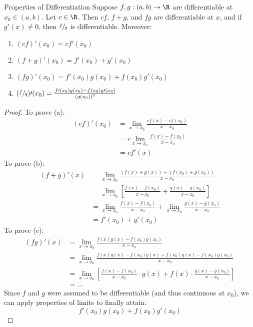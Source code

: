 \begin{thmbox}{Properties of Differentiation}{}
    Suppose $f,g : (a,b) \to \R$ are differentiable at $x_0 \in (a,b)$. Let $c \in \R$. Then $cf$, $f+g$, and $fg$ are differentiable at $x$, and if $g\prime(x) \neq 0$, then $\sfrac{f}{g}$ is differentiable. Moreover:
    \begin{enumerate}[label=(\alph*)]
        \item $(cf)\prime(x_0) = cf\prime(x_0)$
        \item $(f+g)\prime(x_0) = f\prime(x_0) + g\prime(x_0)$
        \item $(fg)\prime(x_0) = f\prime (x_0) g(x_0) + f(x_0) g\prime (x_0)$
        \item $( \sfrac{f}{g})\prime(x_0) = \frac{f\prime(x_0) g(x_0) - f(x_0) g\prime(x_0)}{\left( g(x_0) \right)^2}$
    \end{enumerate}
    \tcblower
    \begin{proof}[Proof]
        To prove (a):
        \begin{align*}
            (cf)\prime(x_0)
            &= \lim_{x \to x_0} \frac{cf(x) - cf(x_0)}{x - x_0} \\
            &= c \lim_{x \to x_0} \frac{f(x) - f(x_0)}{x - x_0} \\
            &= c f\prime(x)
        \end{align*}
        To prove (b):
        \begin{align*}
            (f+g)\prime(x)
            &= \lim_{x \to x_0} \frac{\left( f(x) + g(x) \right) - \left( f(x_0) + g(x_0) \right)}{x - x_0} \\
            &= \lim_{x \to x_0} \left[ \frac{f(x) - f(x_0)}{x - x_0} + \frac{g(x) - g(x_0)}{x - x_0} \right] \\
            &= \lim_{x \to x_0} \frac{f(x) - f(x_0)}{x - x_0} + \lim_{x \to x_0} \frac{g(x) - g(x_0)}{x - x_0} \\
            &= f\prime(x_0) + g\prime(x_0)
        \end{align*}
        To prove (c):
        \begin{align*}
            (fg)\prime(x)
            &= \lim_{x \to x_0} \frac{f(x)g(x) - f(x_0)g(x_0)}{x - x_0} \\
            &= \lim_{x \to x_0} \frac{f(x)g(x) - f(x_0)g(x) + f(x_0)g(x) - f(x_0)g(x_0)}{x - x_0} \\
            &= \lim_{x \to x_0} \left[ \frac{f(x) - f(x_0)}{x - x_0} \cdot g(x) + f(x) \cdot \frac{g(x) - g(x_0)}{x - x_0} \right] \\
            &= \ldots
        \end{align*}
        Since $f$ and $g$ were assumed to be differentiable (and thus continuous at $x_0$), we can apply properties of limits to finally attain:
        \[ f\prime(x_0) g(x_0) + f(x_0) g\prime(x_0) \]
    \end{proof}
\end{thmbox}

